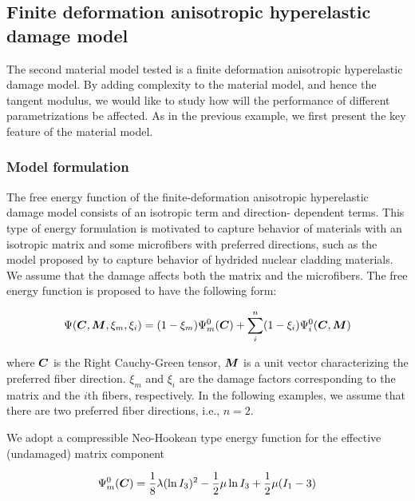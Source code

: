 \documentclass[12pt]{article}
\numberwithin{equation}{section}
\begin{document}
\subsection{Finite deformation anisotropic hyperelastic damage model}
\label{subsec:anisotropic}

The second material model tested is a finite deformation anisotropic 
hyperelastic damage model. By adding complexity to the material model, 
and hence the tangent modulus, we would like to study how will the 
performance of different parametrizations be affected. As in the 
previous example, we first present the key feature of the material 
model.

\subsubsection{Model formulation}

The free energy function of the finite-deformation anisotropic 
hyperelastic damage model consists of an isotropic term and direction-
dependent terms. This type of energy formulation is motivated to 
capture behavior of materials with an isotropic matrix and some 
microfibers with preferred directions, such as the model proposed by
\citet{Chen.etal:2014} to capture behavior of hydrided nuclear 
cladding materials. We assume that the damage affects both the matrix 
and the microfibers. The free energy function is proposed to have the 
following form:

\begin{equation}\label{eq:aniso_energy}
  \Psi ({\boldsymbol{C}}, {\boldsymbol{M}}, \xi_m, \xi_i) 
    = (1-\xi_m) \Psi_m^0({\boldsymbol{C}}) 
    + \sum_{i}^{n} (1-\xi_i)\Psi_i^0({\boldsymbol{C}}, {\boldsymbol{M}})
\end{equation}

where ${\boldsymbol{C}}$ is the Right Cauchy-Green tensor, ${\boldsymbol{M}}$ is a
unit vector characterizing the preferred fiber direction. $\xi_m$ and
$\xi_i$ are the damage factors corresponding to the matrix and the 
$i$th fibers, respectively. In the following examples, we assume that 
there are two preferred fiber directions, i.e., $n=2$.

We adopt a compressible Neo-Hookean type energy function for the 
effective (undamaged) matrix component

\begin{equation}\label{eq:aniso_Psim0}
  \Psi_m^0 ({\boldsymbol{C}}) 
    = \frac{1}{8}\lambda (\ln I_3)^2
    - \frac{1}{2}\mu \ln I_3 
    + \frac{1}{2}\mu( I_1 - 3)
\end{equation}
\end{document}
